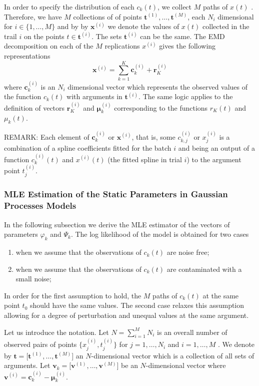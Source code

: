 \documentclass[article,moreauthors,pdftex,10pt,a4paper]{ssrn}
\begin{document}
In order to specify the distribution of each $c_k(t)$, we collect $M$ paths of $x(t)$ . Therefore, we have $M$ collections of of points $\mathbf{t}^{(1)} , \ldots, \mathbf{t}^{(M)}$, each $N_i$ dimensional for $i \in \Big\{1,\ldots,M\Big\}$ and by  by $\mathbf{x}^{(i)}$ we denote the values of $x(t)$ collected in the trail $i$ on the points $t \in \mathbf{t}^{(i)}$.  The sets $\mathbf{t}^{(i)}$ can be the same.
The EMD decomposition on each of the $M$ replications  $x^{(i)}$ gives the following representations
\begin{equation}
\mathbf{x}^{(i)} = \sum_{k = 1}^K \mathbf{c}_k^{(i)}+ \mathbf{r}^{(i)}_K 
\end{equation}
where $\mathbf{c}_k^{(i)}$ is an $N_i$ dimensional vector which represents the observed values of the function $c_k(t)$ with arguments in $\mathbf{t}^{(i)}$. The same logic applies to the definition of vectors $\mathbf{r}^{(i)}_K $ and  $\bm{\mu}_k^{(i)}$  corresponding to the functions $r_K(t)$ and $\mu_k(t)$.

{\color{red}
REMARK: Each element of $\mathbf{c}_k^{(i)}$ or $\mathbf{x}^{(i)}$, that is, some $c_{k,j}^{(i)}$ or $x_{j}^{(i)}$ is a combination of a spline coefficients fitted for the batch $i$ and being an output of a function $c_k^{(i)}(t)$ and $x^{(i)}(t)$ (the fitted spline in trial $i$) to the argument point $t^{(i)}_j$.
}

\subsubsection{MLE Estimation of the Static Parameters in Gaussian Processes Models}
In the following subsection we derive the MLE estimator of the vectors of parameters $\varphi_k$ and $\Psi_k$. The log likelihood of the model is obtained for two cases
\begin{enumerate}
\item when we assume that the observations of $c_k(t)$ are noise free;
\item when we assume that the observations of $c_k(t)$ are contaminated with  a small noise;
\end{enumerate}
In order for the first assumption to hold, the $M$ paths of $c_k(t)$ at the same point $t_0$ should have the same values.  The second case relaxes this assumption allowing for a degree of perturbation and unequal values at the same argument. 

Let us introduce the notation.  Let $N = \sum_{i=1}^M N_i$ is an overall number of  observed pairs of points $\big\{x_j^{(i)}, t^{(i)}_j \big\}$  for $j = 1,\dots,N_i$ and $i = 1,\ldots	, M$ . We denote by $\mathbf{t} = \big[ \mathbf{t}^{(1)} ,\ldots,\mathbf{t}^{(M)} \big]$ an $N$-dimensional vector which is a collection of all sets of arguments. Let  $\mathbf{v}_k = \big[ \mathbf{v}^{(1)} ,\ldots,\mathbf{v}^{(M)} \big]$ be an $N$-dimensional vector where $\mathbf{v}^{(i)}= \mathbf{c}_k^{(i)} - \bm{\mu}_k^{(i)}$.
\end{document}
